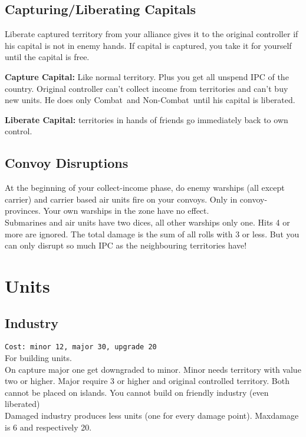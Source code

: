 \documentclass[10pt,a4paper,landscape]{article}
\begin{document}
\begin{multicols*}{3}
\subsection*{Capturing/Liberating Capitals}
Liberate captured territory from your alliance gives it to the original controller if his capital is not in enemy hands. If capital is captured, you take it for yourself until the capital is free.

\textbf{Capture Capital:} Like normal territory. Plus you get all unspend IPC of the country. Original controller can't collect income from territories and can't buy new units. He does only \glqq Combat\grqq\ and \glqq Non-Combat\grqq\ until his capital is liberated.

\textbf{Liberate Capital:} territories in hands of friends go immediately back to own control.

\subsection*{Convoy Disruptions}
At the beginning of your collect-income phase, do enemy warships (all except carrier) and carrier based air units fire on your convoys. Only in convoy-provinces. Your own warships in the zone have no effect.\\
Submarines and air units have two dices, all other warships only one. Hits 4 or more are ignored. The total damage is the sum of all rolls with 3 or less. But you can only disrupt so much IPC as the neighbouring territories have!

\pagebreak

\section*{Units}
\subsection*{Industry}
\texttt{Cost: minor 12, major 30, upgrade 20}\\
For building units.\\
On capture major one get downgraded to minor.
Minor needs territory with value two or higher. Major require 3 or higher and original controlled territory. Both cannot be placed on islands. You cannot build on friendly industry (even liberated)\\
Damaged industry produces less units (one for every damage point). Maxdamage is 6 and respectively 20.


\end{multicols*}
\end{document}
